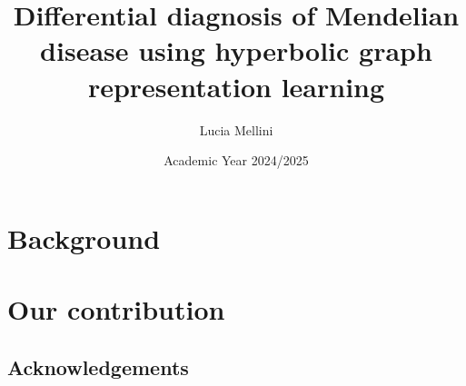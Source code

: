 \documentclass[a4paper, dottedtoc]{book}
\title{Differential diagnosis of Mendelian disease using hyperbolic graph representation learning}
\author{Lucia Mellini}
\date{Academic Year 2024/2025}
\begin{document}
\tikzifexternalizing{}{}


\maketitle

\frontmatter

\tableofcontents
   
\mainmatter
\setcounter{chapter}{-1}

\part*{\large Background}




\part*{\large Our contribution}

% 





\chapter*{Acknowledgements}
\end{document}
